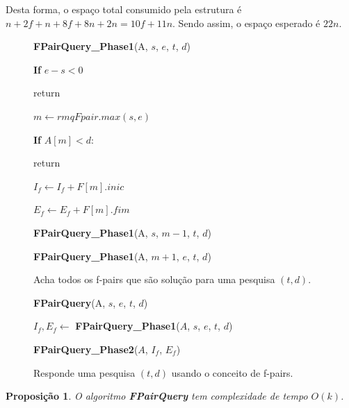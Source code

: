 \documentclass[12pt]{article}
\newtheorem{prop}[thm]{Proposição}
\begin{document}
Desta forma, o espaço total consumido pela estrutura é $n + 2f + n + 8f + 8n + 2n = 10f + 11n$. Sendo assim, 
o espaço esperado é $22n$.


\clearpage
\begin{figure}
\begin{framed}
{\bf FPairQuery\_Phase1}(A, $s$, $e$, $t$, $d$)

\hspace{1cm} {\bf If} $e - s < 0$

\hspace{2cm} return

\hspace{1cm} $m \leftarrow rmqFpair.max(s, e)$

\hspace{1cm} {\bf If} $A[m] < d$:

\hspace{2cm} return

\hspace{1cm} $I_f \leftarrow I_f + F[m].inic$

\hspace{1cm} $E_f \leftarrow E_f + F[m].fim$

\hspace{1cm} {\bf FPairQuery\_Phase1}(A, $s$, $m - 1$, $t$, $d$)

\hspace{1cm} {\bf FPairQuery\_Phase1}(A, $m + 1$, $e$, $t$, $d$)

\end{framed}
\caption{Acha todos os f-pairs que são solução para uma pesquisa $(t, d)$.}
\label{fpairqueryphase1}
\end{figure}


\begin{figure}
\begin{framed}
{\bf FPairQuery}(A, $s$, $e$, $t$, $d$)

\hspace{1cm} $I_f, E_f \leftarrow$ {\bf FPairQuery\_Phase1}($A$, $s$, $e$, $t$, $d$)

\hspace{1cm} {\bf FPairQuery\_Phase2}($A$, $I_f$, $E_f$)
\end{framed}
\caption{Responde uma pesquisa $(t, d)$ usando o conceito de f-pairs.}
\label{fpairquery}
\end{figure}

\begin{prop}
O algoritmo {\bf FPairQuery} tem complexidade de tempo $O(k)$.
\end{prop}
\end{document}
